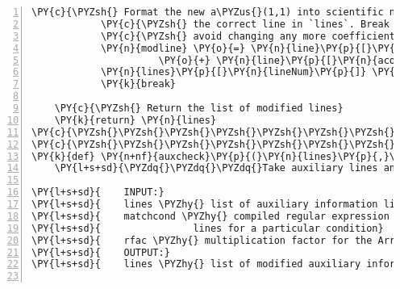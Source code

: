 \begin{Verbatim}[commandchars=\\\{\},fontsize=\small,numbers=left,firstnumber=1,stepnumber=2,firstline=2]
            \PY{c}{\PYZsh{} Format the new a\PYZus{}(1,1) into scientific notation. Replace}
            \PY{c}{\PYZsh{} the correct line in `lines`. Break out of the loop to}
            \PY{c}{\PYZsh{} avoid changing any more coefficients.}
            \PY{n}{modline} \PY{o}{=} \PY{n}{line}\PY{p}{[}\PY{p}{:}\PY{n}{acoeff}\PY{o}{.}\PY{n}{start}\PY{p}{(}\PY{p}{)}\PY{p}{]} \PY{o}{+} \PY{l+s}{\PYZsq{}}\PY{l+s}{\PYZob{}0:13.6E\PYZcb{}}\PY{l+s}{\PYZsq{}}\PY{o}{.}\PY{n}{format}\PY{p}{(}\PY{n}{x}\PY{p}{)}\PYZbs{}
                      \PY{o}{+} \PY{n}{line}\PY{p}{[}\PY{n}{acoeff}\PY{o}{.}\PY{n}{end}\PY{p}{(}\PY{p}{)}\PY{p}{:}\PY{p}{]}
            \PY{n}{lines}\PY{p}{[}\PY{n}{lineNum}\PY{p}{]} \PY{o}{=} \PY{n}{modline}
            \PY{k}{break}

    \PY{c}{\PYZsh{} Return the list of modified lines}
    \PY{k}{return} \PY{n}{lines}
\PY{c}{\PYZsh{}\PYZsh{}\PYZsh{}\PYZsh{}\PYZsh{}\PYZsh{}\PYZsh{}\PYZsh{}\PYZsh{}\PYZsh{}\PYZsh{}\PYZsh{}\PYZsh{}\PYZsh{}\PYZsh{}\PYZsh{}\PYZsh{}\PYZsh{}\PYZsh{}\PYZsh{}\PYZsh{}\PYZsh{}\PYZsh{}\PYZsh{}\PYZsh{}\PYZsh{}\PYZsh{}\PYZsh{}\PYZsh{}\PYZsh{}\PYZsh{}\PYZsh{}\PYZsh{}\PYZsh{}\PYZsh{}\PYZsh{}\PYZsh{}\PYZsh{}\PYZsh{}\PYZsh{}\PYZsh{}\PYZsh{}\PYZsh{}\PYZsh{}\PYZsh{}\PYZsh{}\PYZsh{}\PYZsh{}\PYZsh{}\PYZsh{}\PYZsh{}\PYZsh{}\PYZsh{}\PYZsh{}\PYZsh{}\PYZsh{}\PYZsh{}\PYZsh{}\PYZsh{}\PYZsh{}\PYZsh{}\PYZsh{}\PYZsh{}\PYZsh{}\PYZsh{}\PYZsh{}\PYZsh{}\PYZsh{}\PYZsh{}\PYZsh{}\PYZsh{}\PYZsh{}\PYZsh{}\PYZsh{}\PYZsh{}\PYZsh{}\PYZsh{}\PYZsh{}\PYZsh{}}
\PY{c}{\PYZsh{}\PYZsh{}\PYZsh{}\PYZsh{}\PYZsh{}\PYZsh{}\PYZsh{}\PYZsh{}\PYZsh{}\PYZsh{}\PYZsh{}\PYZsh{}\PYZsh{}\PYZsh{}\PYZsh{}\PYZsh{}\PYZsh{}\PYZsh{}\PYZsh{}\PYZsh{}\PYZsh{}\PYZsh{}\PYZsh{}\PYZsh{}\PYZsh{}\PYZsh{}\PYZsh{}\PYZsh{}\PYZsh{}\PYZsh{}\PYZsh{}\PYZsh{}\PYZsh{}\PYZsh{}\PYZsh{}\PYZsh{}\PYZsh{}\PYZsh{}\PYZsh{}\PYZsh{}\PYZsh{}\PYZsh{}\PYZsh{}\PYZsh{}\PYZsh{}\PYZsh{}\PYZsh{}\PYZsh{}\PYZsh{}\PYZsh{}\PYZsh{}\PYZsh{}\PYZsh{}\PYZsh{}\PYZsh{}\PYZsh{}\PYZsh{}\PYZsh{}\PYZsh{}\PYZsh{}\PYZsh{}\PYZsh{}\PYZsh{}\PYZsh{}\PYZsh{}\PYZsh{}\PYZsh{}\PYZsh{}\PYZsh{}\PYZsh{}\PYZsh{}\PYZsh{}\PYZsh{}\PYZsh{}\PYZsh{}\PYZsh{}\PYZsh{}\PYZsh{}\PYZsh{}}
\PY{k}{def} \PY{n+nf}{auxcheck}\PY{p}{(}\PY{n}{lines}\PY{p}{,}\PY{n}{matchcond}\PY{p}{,}\PY{n}{rfac}\PY{p}{)}\PY{p}{:}
    \PY{l+s+sd}{\PYZdq{}\PYZdq{}\PYZdq{}Take auxiliary lines and return lines with modified Arrhenius coefficients.}

\PY{l+s+sd}{    INPUT:}
\PY{l+s+sd}{    lines \PYZhy{} list of auxiliary information lines to check}
\PY{l+s+sd}{    matchcond \PYZhy{} compiled regular expression used to search the auxiliary}
\PY{l+s+sd}{                lines for a particular condition}
\PY{l+s+sd}{    rfac \PYZhy{} multiplication factor for the Arrhenius coefficients}
\PY{l+s+sd}{    OUTPUT:}
\PY{l+s+sd}{    lines \PYZhy{} list of modified auxiliary information lines}


\end{Verbatim}
